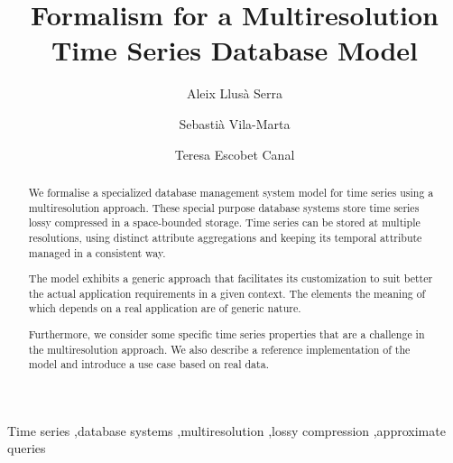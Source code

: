\documentclass[
  twocolumn,
  5p,
  sort&compress,
]{elsarticle}
\begin{document}


\begin{frontmatter}

  \title{Formalism for a Multiresolution Time Series Database Model}


  \author
  [dipse]
  {Aleix Llus\`{a} Serra}

  \author
  [dipse]
  {Sebasti\`{a} Vila-Marta
  }

  \author
  [dipse]
  {Teresa Escobet Canal
  }



  \address
  [dipse]
  {Department of Electronic System Design and Programming\\ 
    Universitat Polit\`{e}cnica de Catalunya\\ 
    Av.~Bases de Manresa 61--73, 08242 Manresa, ES-CT}



  \begin{abstract}
    We formalise a specialized database management system model for
    time series using a multiresolution approach. These special
    purpose database systems store time series lossy compressed in a
    space-bounded storage. Time series can be stored at multiple
    resolutions, using distinct attribute aggregations and keeping its
    temporal attribute managed in a consistent way.

    The model exhibits a generic approach that facilitates its
    customization to suit better the actual application requirements
    in a given context. The elements the meaning of which
    depends on a real application are of generic nature.
   
    Furthermore, we consider some specific time series properties that
    are a challenge in the multiresolution approach. We also describe
    a reference implementation of the model and introduce a use case
    based on real data.
  \end{abstract}


  \begin{keyword}
    Time series \sep database systems \sep multiresolution \sep lossy
    compression \sep approximate queries
  \end{keyword}

\end{frontmatter}
\end{document}
